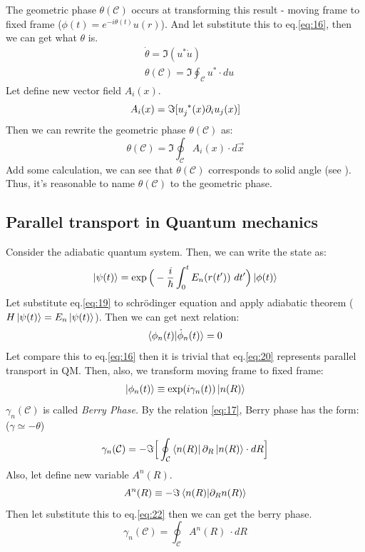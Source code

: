 \documentclass[%
 reprint,
 amsmath,amssymb,
 aps,
]{revtex4-1}
\begin{document}
The geometric phase $\theta(\mathcal{C})$ occurs at transforming this result - moving frame to fixed frame (\(\phi(t)=e^{-i\theta(t)}u(r)\)). And let substitute this to eq.\eqref{eq:16}, then we can get what $\theta$ is.
\begin{equation}\label{eq:17}
\begin{split}
&\dot{\theta}=\Im(u^*\dot{u})\\
&\theta(\mathcal{C})=\Im\oint_{\mathcal{C}}u^*\cdot du
\end{split}
\end{equation}
Let define new vector field $A_i(x)$.
\[A_i(x)=\Im[\tensor{u}{_j^*}(x)\partial_i u_j(x)]\]
Then we can rewrite the geometric phase $\theta(\mathcal{C})$ as:
\begin{equation}\label{eq:18}
\theta(\mathcal{C})=\Im\oint_{\mathcal{C}}A_i(x)\cdot d\vec{x}
\end{equation}
Add some calculation, we can see that $\theta(\mathcal{C})$ corresponds to solid angle (see \cite{pt}). Thus, it's reasonable to name $\theta(\mathcal{C})$ to the geometric phase.\\

\subsection{\label{sec:level3.2}Parallel transport in Quantum mechanics}

Consider the adiabatic quantum system. Then, we can write the state as:
\begin{equation}\label{eq:19}
\ket{\psi(t)}=\exp\Big(-\frac{i}{\hbar}\int_{0}^{t} E_n(r(t'))\ dt'\Big)\ket{\phi(t)}
\end{equation}
Let substitute eq.\eqref{eq:19} to schr{\"o}dinger equation and apply adiabatic theorem (\(H\ket{\psi(t)}=E_n\ket{\psi(t)}\)). Then we can get next relation:
\begin{equation}\label{eq:20}
\braket{\phi_n(t)|\dot{\phi}_n(t)}=0
\end{equation}
Let compare this to eq.\eqref{eq:16} then it is trivial that eq.\eqref{eq:20} represents parallel transport in QM. Then, also, we transform moving frame to fixed frame:
\begin{equation}\label{eq:21}
\ket{\phi_n(t)}\equiv\exp(i\gamma_n(t))\ket{n(R)}
\end{equation}
$\gamma_n(\mathcal{C})$ is called \textit{Berry Phase.} By the relation \eqref{eq:17}, Berry phase has the form: ($\gamma\simeq-\theta$)
\begin{equation}\label{eq:22}
\gamma_n(\mathcal{C})=-\Im\Big[\oint_{\mathcal{C}}\bra{n(R)}\partial_R\ket{n(R)}\cdot dR \Big]
\end{equation}
Also, let define new variable $A^n(R)$.
\[A^n(R)\equiv-\Im\braket{n(R)|\partial_R n(R)}\]
Then let substitute this to eq.\eqref{eq:22} then we can get the berry phase.
\begin{equation}\label{eq:23}
\gamma_n(\mathcal{C})=\oint_{\mathcal{C}}A^n(R)\ \cdot dR
\end{equation}
\end{document}
